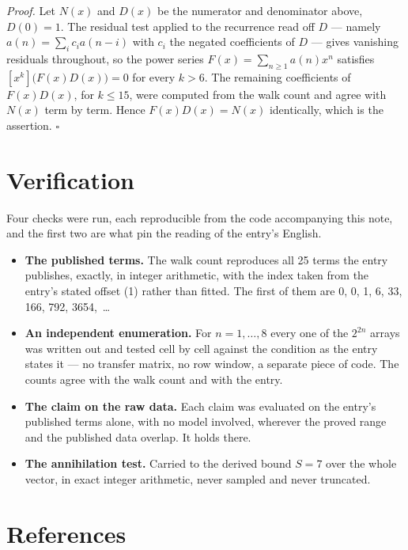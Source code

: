 \documentclass[11pt]{article}
\theoremstyle{definition}
\begin{document}
{\itshape Proof.} Let $N(x)$ and $D(x)$ be the numerator and denominator above, $D(0)=1$. The residual test applied to the recurrence read off $D$ --- namely $a(n) = \sum_i c_i a(n-i)$ with $c_i$ the negated coefficients of $D$ --- gives vanishing residuals throughout, so the power series $F(x)=\sum_{n\ge 1}a(n)x^n$ satisfies $[x^k]\bigl(F(x)D(x)\bigr) = 0$ for every $k > 6$. The remaining coefficients of $F(x)D(x)$, for $k \le 15$, were computed from the walk count and agree with $N(x)$ term by term. Hence $F(x)D(x) = N(x)$ identically, which is the assertion. $\square$

\section{Verification}

Four checks were run, each reproducible from the code accompanying this note, and the first two are what pin the reading of the entry's English.

\begin{itemize}

\item {\bfseries The published terms.} The walk count reproduces all 25 terms the entry publishes, exactly, in integer arithmetic, with the index taken from the entry's stated offset (1) rather than fitted. The first of them are 0, 0, 1, 6, 33, 166, 792, 3654,~\dots

\item {\bfseries An independent enumeration.} For $n = 1,\dots,8$ every one of the $2^{2n}$ arrays was written out and tested cell by cell against the condition as the entry states it --- no transfer matrix, no row window, a separate piece of code. The counts agree with the walk count and with the entry.

\item {\bfseries The claim on the raw data.} Each claim was evaluated on the entry's published terms alone, with no model involved, wherever the proved range and the published data overlap. It holds there.

\item {\bfseries The annihilation test.} Carried to the derived bound $S = 7$ over the whole vector, in exact integer arithmetic, never sampled and never truncated.

\end{itemize}

\section{References}
\end{document}
